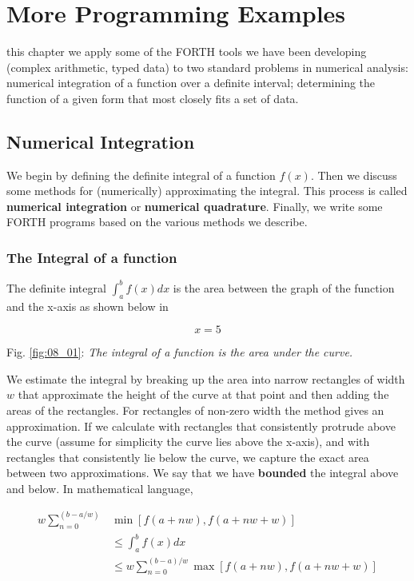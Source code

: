 
\chapter{More Programming Examples}\label{chap:08}

 this chapter we apply some of the FORTH tools we have been developing (complex arithmetic, typed data) to two standard problems in numerical analysis: numerical integration of a function over a definite interval; determining the function of a given form that most closely fits a set of data.

\section{Numerical Integration}
We begin by defining the definite integral of a function $f(x)$. Then we discuss some methods for (numerically) approximating the integral. This process is called \textbf{numerical integration} or \textbf{numerical quadrature}. Finally, we write some FORTH programs based on the various methods we describe.

\subsection{The Integral of a function}
The definite integral $\int_{a}^{b}f(x) dx$ is the area between the graph of the function and the x-axis as shown below in

\begin{equation} \label{fig:08_01}
x=5
\end{equation}

Fig. \ref{fig:08_01}: \textit{The integral of a function is the area under the curve.}

We estimate the integral by breaking up the area into narrow rectangles of width $w$ that approximate the height of the curve at that point and then adding the areas of the rectangles. For rectangles of non-zero width the method gives an approximation. If we calculate with rectangles that consistently protrude above the curve (assume for simplicity the curve lies above the x-axis), and with rectangles that consistently lie below the curve, we capture the exact area between two approximations. We say that we have \textbf{bounded} the integral above and below. In mathematical language,

\begin{equation}
    \begin{split}
    w \sum_{n=0}^{(b-a/w)} & \min[f(a+nw),f(a+nw+w)] \\
    & \leq \int_{a}^{b}f(x) dx \\
    & \leq w \sum_{n=0}^{(b-a)/w} \max[f(a+nw),f(a+nw+w)]
    \end{split}
\end{equation}

